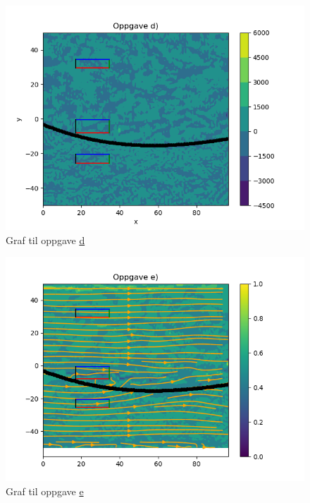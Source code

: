 \documentclass[a4paper,10pt,norsk]{article}
\begin{document}
	\begin{figure}[h!]
		\centering
		\caption{Graf til oppgave \hyperref[ass:d]{d}}
		\label{fig:d}
		\includegraphics{oppgave_d.png}
	\end{figure}
	\newpage
	\begin{figure}[h!]
		\centering
		\caption{Graf til oppgave \hyperref[ass:e]{e}}
		\label{fig:e}
		\includegraphics{oppgave_e.png}
	\end{figure}
\newpage
\end{document}
